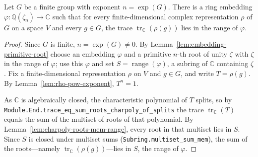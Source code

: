 \begin{theorem}
    \label{thm:brauer-character-in-cyclotomic}
    \leanok
    Let $G$ be a finite group with exponent $n = \exp(G)$. There is a ring
    embedding $\varphi : \mathbb{Q}(\zeta_n) \to \mathbb{C}$ such that for every
    finite-dimensional complex representation $\rho$ of $G$ on a space $V$ and
    every $g \in G$, the trace $\operatorname{tr}_{\mathbb{C}}(\rho(g))$ lies in
    the range of $\varphi$.
\end{theorem}
\begin{proof}
    Since $G$ is finite, $n = \exp(G) \neq 0$. By
    Lemma~\ref{lem:embedding-primitive-root} choose an embedding $\varphi$ and a
    primitive $n$-th root of unity $\zeta$ with $\zeta$ in the range of $\varphi$;
    use this $\varphi$ and set $S = \operatorname{range}(\varphi)$, a subring of
    $\mathbb{C}$ containing $\zeta$. Fix a finite-dimensional representation
    $\rho$ on $V$ and $g \in G$, and write $T = \rho(g)$. By
    Lemma~\ref{lem:rho-pow-exponent}, $T^n = 1$.

    As $\mathbb{C}$ is algebraically closed, the characteristic polynomial of $T$
    splits, so by \texttt{Module.End.trace\_eq\_sum\_roots\_charpoly\_of\_splits}
    the trace $\operatorname{tr}_{\mathbb{C}}(T)$ equals the sum of the multiset of
    roots of that polynomial. By Lemma~\ref{lem:charpoly-roots-mem-range}, every
    root in that multiset lies in $S$. Since $S$ is closed under multiset sums
    (\texttt{Subring.multiset\_sum\_mem}), the sum of the roots---namely
    $\operatorname{tr}_{\mathbb{C}}(\rho(g))$---lies in $S$, the range of
    $\varphi$.
\end{proof}


